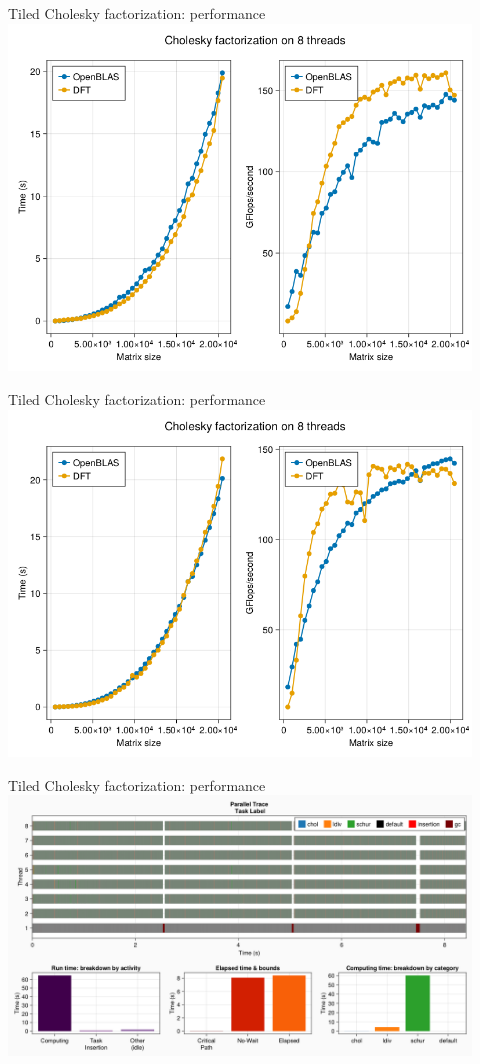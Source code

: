 \documentclass{beamer}
\begin{document}
\begin{frame}{Tiled Cholesky factorization: performance}
  \centering\includegraphics[width=0.92\textwidth]{openblas_large.png}
\end{frame}
\begin{frame}{Tiled Cholesky factorization: performance}
  \centering\includegraphics[width=0.92\textwidth]{perf_large.png}
\end{frame}
  
  \begin{frame}{Tiled Cholesky factorization: performance}
    \centering\includegraphics[width=0.92\textwidth]{trace_with_gc.png}
\end{frame}
\end{document}
